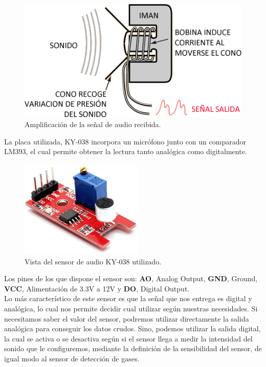 \begin{figure}[H]
  \begin{center}
    \includegraphics[scale=0.6]{imagenes/micro_amplificador.png}
  \end{center}
  \caption{Amplificación de la señal de audio recibida.}
  \label{figura:micro_amplificacion}
\end{figure}

La placa utilizada, KY-038 incorpora un micrófono junto con un comparador LM393, el cual permite obtener la lectura tanto analógica como digitalmente.\\

\begin{figure}[H]
  \begin{center}
    \includegraphics[scale=0.6]{imagenes/micro.png}
  \end{center}
  \caption{Vista del sensor de audio KY-038 utilizado.}
  \label{figura:micro_amplificacion}
\end{figure}

Los pines de los que dispone el sensor son: \textbf{AO}, Analog Output, \textbf{GND}, Ground, \textbf{VCC}, Alimentación de 3.3V a 12V y \textbf{DO}, Digital Output.\\

Lo más característico de este sensor es que la señal que nos entrega es digital y analógica, lo cual nos permite decidir cual utilizar según nuestras necesidades.
Si necesitamos saber el valor del sensor, podremos utilizar directamente la salida analógica para conseguir los datos crudos. Sino, podemos utilizar la salida digital, la cual
se activa o se desactiva según si el sensor llega a medir la intensidad del sonido que le configuremos, mediante la definición de la sensibilidad del sensor, de igual modo al sensor de detección de gases. \\

